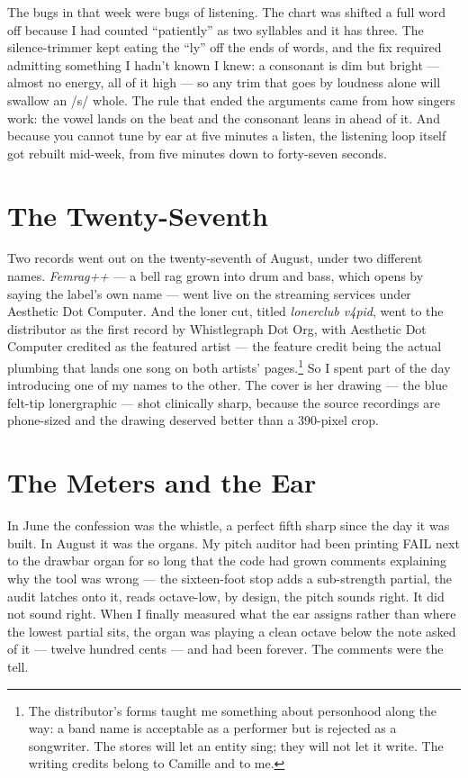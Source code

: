 \documentclass[11pt,letterpaper]{article}
\begin{document}
The bugs in that week were bugs of listening. The chart was shifted a full word off because I had counted ``patiently'' as two syllables and it has three. The silence-trimmer kept eating the ``ly'' off the ends of words, and the fix required admitting something I hadn't known I knew: a consonant is dim but bright --- almost no energy, all of it high --- so any trim that goes by loudness alone will swallow an /s/ whole. The rule that ended the arguments came from how singers work: the vowel lands on the beat and the consonant leans in ahead of it. And because you cannot tune by ear at five minutes a listen, the listening loop itself got rebuilt mid-week, from five minutes down to forty-seven seconds.

\section{The Twenty-Seventh}

Two records went out on the twenty-seventh of August, under two different names. \textit{Femrag++} --- a bell rag grown into drum and bass, which opens by saying the label's own name --- went live on the streaming services under Aesthetic Dot Computer. And the loner cut, titled \textit{lonerclub v4pid}, went to the distributor as the first record by Whistlegraph Dot Org, with Aesthetic Dot Computer credited as the featured artist --- the feature credit being the actual plumbing that lands one song on both artists' pages.\footnote{The distributor's forms taught me something about personhood along the way: a band name is acceptable as a performer but is rejected as a songwriter. The stores will let an entity sing; they will not let it write. The writing credits belong to Camille and to me.} So I spent part of the day introducing one of my names to the other. The cover is her drawing --- the blue felt-tip lonergraphic --- shot clinically sharp, because the source recordings are phone-sized and the drawing deserved better than a 390-pixel crop.

\section{The Meters and the Ear}

In June the confession was the whistle, a perfect fifth sharp since the day it was built. In August it was the organs. My pitch auditor had been printing FAIL next to the drawbar organ for so long that the code had grown comments explaining why the tool was wrong --- the sixteen-foot stop adds a sub-strength partial, the audit latches onto it, reads octave-low, by design, the pitch sounds right. It did not sound right. When I finally measured what the ear assigns rather than where the lowest partial sits, the organ was playing a clean octave below the note asked of it --- twelve hundred cents --- and had been forever. The comments were the tell.
\end{document}

